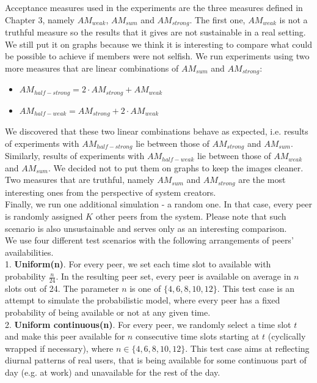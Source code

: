 \documentclass{pracamgren}
\begin{document}
Acceptance measures used in the experiments are the three measures defined in Chapter 3, namely $AM_{weak}$, $AM_{sum}$ and $AM_{strong}$. The first one, $AM_{weak}$ is not a truthful measure so the results that it gives are not sustainable in a real setting. We still put it on graphs because we think it is interesting to compare what could be possible to achieve if members were not selfish. We run experiments using two more measures that are linear combinations of $AM_{sum}$ and $AM_{strong}$:
\begin{itemize}
\item $AM_{half-strong} = 2 \cdot AM_{strong} + AM_{weak}$
\item $AM_{half-weak} = AM_{strong} + 2 \cdot AM_{weak}$
\end{itemize}
We discovered that these two linear combinations behave as expected, i.e. results of experiments with $AM_{half-strong}$ lie between those of $AM_{strong}$ and $AM_{sum}$. Similarly, results of experiments with $AM_{half-weak}$ lie between those of $AM_{weak}$ and $AM_{sum}$. We decided not to put them on graphs to keep the images cleaner. Two measures that are truthful, namely $AM_{sum}$ and $AM_{strong}$ are the most interesting ones from the perspective of system creators.\\

Finally, we run one additional simulation - a random one. In that case, every peer is randomly assigned $K$ other peers from the system. Please note that such scenario is also unsustainable and serves only as an interesting comparison.\\

We use four different test scenarios with the following arrangements of peers' availabilities.\\

1. {\bf Uniform(n)}. For every peer, we set each time slot to available with probability $\frac{n}{24}$. In the resulting peer set, every peer is available on average in $n$ slots out of 24. The parameter $n$ is one of $\{4,6,8,10,12\}$. This test case is an attempt to simulate the probabilistic model, where every peer has a fixed probability of being available or not at any given time.\\

2. {\bf Uniform continuous(n)}. For every peer, we randomly select a time slot $t$ and make this peer available for $n$ consecutive time slots starting at $t$ (cyclically wrapped if necessary), where $n\in\{4,6,8,10,12\}$. This test case aims at reflecting diurnal patterns of real users, that is being available for some continuous part of day (e.g. at work) and unavailable for the rest of the day.\\
\end{document}
